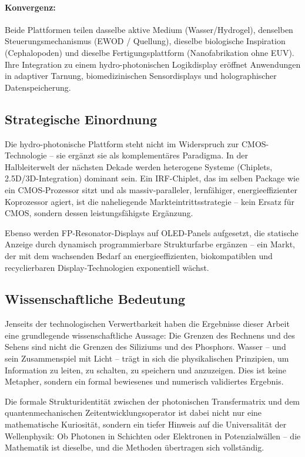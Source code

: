 ﻿\documentclass[a4paper,12pt]{scrreprt}
\theoremstyle{definition}
\begin{document}
\paragraph{Konvergenz:}
Beide Plattformen teilen dasselbe aktive Medium (Wasser/Hydrogel), denselben
Steuerungsmechanismus (EWOD / Quellung), dieselbe biologische Inspiration
(Cephalopoden) und dieselbe Fertigungsplattform (Nanofabrikation ohne EUV).
Ihre Integration zu einem hydro-photonischen Logikdisplay eröffnet
Anwendungen in adaptiver Tarnung, biomedizinischen Sensordisplays und
holographischer Datenspeicherung.

\subsection{Strategische Einordnung}

Die hydro-photonische Plattform steht nicht im Widerspruch zur
CMOS-Technologie -- sie ergänzt sie als komplementäres Paradigma.
In der Halbleiterwelt der nächsten Dekade werden heterogene Systeme
(Chiplets, 2.5D/3D-Integration) dominant sein. Ein IRF-Chiplet, das im
selben Package wie ein CMOS-Prozessor sitzt und als massiv-paralleler,
lernfähiger, energieeffizienter Koprozessor agiert, ist die naheliegende
Markteintrittsstrategie -- kein Ersatz für CMOS, sondern dessen
leistungsfähigste Ergänzung.

Ebenso werden FP-Resonator-Displays auf OLED-Panels aufgesetzt, die
statische Anzeige durch dynamisch programmierbare Strukturfarbe ergänzen --
ein Markt, der mit dem wachsenden Bedarf an energieeffizienten,
biokompatiblen und recyclierbaren Display-Technologien exponentiell wächst.

\subsection{Wissenschaftliche Bedeutung}

Jenseits der technologischen Verwertbarkeit haben die Ergebnisse dieser
Arbeit eine grundlegende wissenschaftliche Aussage: Die Grenzen des Rechnens
und des Sehens sind nicht die Grenzen des Siliziums und des Phosphors.
Wasser -- und sein Zusammenspiel mit Licht -- trägt in sich die physikalischen
Prinzipien, um Information zu leiten, zu schalten, zu speichern und
anzuzeigen. Dies ist keine Metapher, sondern ein formal bewiesenes und
numerisch validiertes Ergebnis.

Die formale Strukturidentität zwischen der photonischen Transfermatrix und
dem quantenmechanischen Zeitentwicklungsoperator ist dabei nicht nur eine
mathematische Kuriosität, sondern ein tiefer Hinweis auf die Universalität
der Wellenphysik: Ob Photonen in Schichten oder Elektronen in Potenzialwällen --
die Mathematik ist dieselbe, und die Methoden übertragen sich vollständig.
\end{document}

